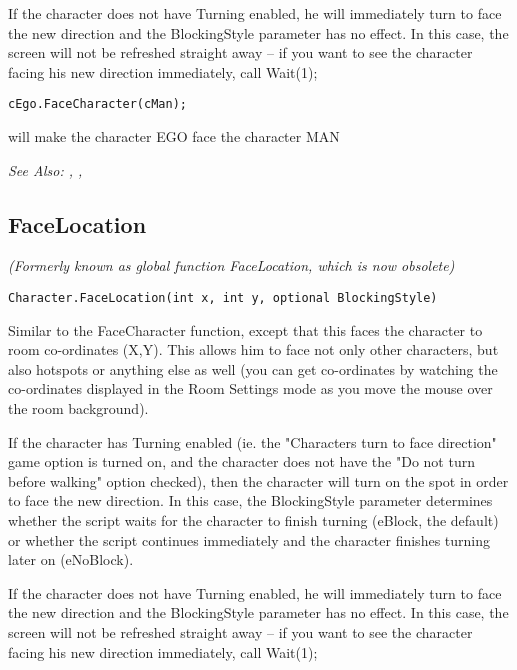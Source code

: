 If the character does not have Turning enabled, he will immediately turn to face the
new direction and the BlockingStyle parameter has no effect. In this case, the screen
will not be refreshed straight away -- if you want to see the character facing his new direction
immediately, call  Wait(1);

\begin{verbatim}
cEgo.FaceCharacter(cMan);
\end{verbatim}
will make the character EGO face the character MAN

\it{See Also:} ,
,


\subsection{FaceLocation}\label{Character.FaceLocation}%

\it{(Formerly known as global function FaceLocation, which is now obsolete)}

\begin{verbatim}
Character.FaceLocation(int x, int y, optional BlockingStyle)
\end{verbatim}
Similar to the FaceCharacter function, except that this faces the character
to room co-ordinates (X,Y). This allows him to face not only other characters,
but also hotspots or anything else as well (you can get co-ordinates by
watching the co-ordinates displayed in the Room Settings mode as you move the mouse
over the room background).

If the character has Turning enabled (ie. the "Characters turn to face direction" game
option is turned on, and the character does not have the "Do not turn before walking"
option checked), then the character will turn on the spot in order to face the new direction.
In this case, the BlockingStyle parameter determines whether the script waits for the
character to finish turning (eBlock, the default) or whether the script continues immediately
and the character finishes turning later on (eNoBlock).

If the character does not have Turning enabled, he will immediately turn to face the
new direction and the BlockingStyle parameter has no effect. In this case, the screen
will not be refreshed straight away -- if you want to see the character facing his new direction
immediately, call  Wait(1);

